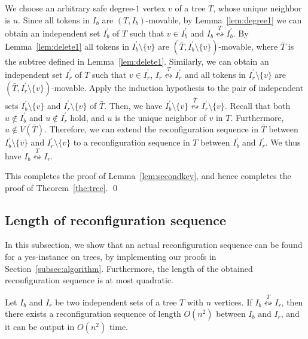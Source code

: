 \documentclass{llncs}
\newcommand{\bfI}{I}
\newcommand{\sevstep}{\leftrightsquigarrow}
\newcommand{\sevstepT}[1]{\overset{#1}{\sevstep}}
\newcommand{\Tminus}{\bar{T}}
\newcounter{two}
\begin{document}
	We choose an arbitrary safe degree-$1$ vertex $v$ of a tree $T$, whose unique neighbor is $u$. 
	Since all tokens in $\bfI_b$ are $(T, \bfI_b)$-movable, by Lemma~\ref{lem:degree1} we can obtain an independent set $\bfI_b^\prime$ of $T$ such that $v \in \bfI_b^\prime$ and $\bfI_b \sevstepT{T} \bfI_b^\prime$. 
	By Lemma~\ref{lem:delete1} all tokens in $\bfI_b^\prime \setminus \{ v \}$ are $(\Tminus, \bfI_b^\prime \setminus \{v\})$-movable, where $\Tminus$ is the subtree defined in Lemma~\ref{lem:delete1}. 
	Similarly, we can obtain an independent set $\bfI_r^\prime$ of $T$ such that $v \in \bfI_r^\prime$, $\bfI_r \sevstepT{T} \bfI_r^\prime$ and all tokens in $\bfI_r^\prime \setminus \{ v \}$ are $(\Tminus, \bfI_r^\prime \setminus \{v\})$-movable. 
	Apply the induction hypothesis to the pair of independent sets $\bfI_b^\prime \setminus \{ v\}$ and $\bfI_r^\prime \setminus \{v\}$ of $\Tminus$.
	Then, we have $\bfI_b^\prime \setminus \{ v\} \sevstepT{\Tminus} \bfI_r^\prime \setminus \{v\}$.
	Recall that both $u \not\in \bfI_b^\prime$ and $u \not\in \bfI_r^\prime$ hold, and $u$ is the unique neighbor of $v$ in $T$.
	Furthermore, $u \not\in V(\Tminus)$. 
	Therefore, we can extend the reconfiguration sequence in $\Tminus$ between $\bfI_b^\prime \setminus \{v\}$ and $\bfI_r^\prime \setminus \{v\}$ to a reconfiguration sequence in $T$ between $\bfI_b^\prime$ and $\bfI_r^\prime$. 
	We thus have $\bfI_b \sevstepT{T} \bfI_r$. 
	
	This completes the proof of Lemma~\ref{lem:secondkey}, and hence completes the proof of Theorem~\ref{the:tree}.
\qed





	\subsection{Length of reconfiguration sequence}
	\label{subsec:length}
	
	In this subsection, we show that an actual reconfiguration sequence can be found for a yes-instance on trees, by implementing our proofs in Section~\ref{subsec:algorithm}.
	Furthermore, the length of the obtained reconfiguration sequence is at most quadratic. 
	\begin{theorem} \label{the:length}
	Let $\bfI_b$ and $\bfI_r$ be two independent sets of a tree $T$ with $n$ vertices. 
	If $\bfI_b \sevstepT{T} \bfI_r$, then there exists a reconfiguration sequence of length $O(n^2)$ between $\bfI_b$ and $\bfI_r$, and it can be output in $O(n^2)$ time. 
	\end{theorem}
	
\end{document}
